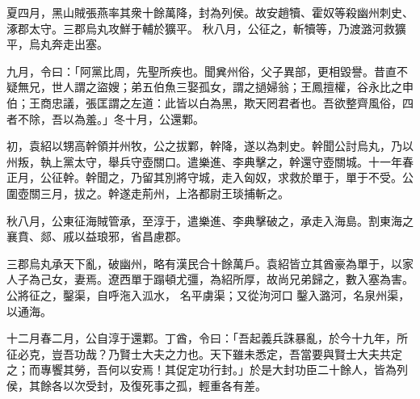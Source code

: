 \begin{pinyinscope}
夏四月，黑山賊張燕率其衆十餘萬降，封為列侯。故安趙犢、霍奴等殺幽州刺史、涿郡太守。三郡烏丸攻鮮于輔於獷平。
秋八月，公征之，斬犢等，乃渡潞河救獷平，烏丸奔走出塞。


九月，令曰：「阿黨比周，先聖所疾也。聞兾州俗，父子異部，更相毀譽。昔直不疑無兄，世人謂之盜嫂；弟五伯魚三娶孤女，謂之撾婦翁；王鳳擅權，谷永比之申伯；王商忠議，張匡謂之左道：此皆以白為黑，欺天罔君者也。吾欲整齊風俗，四者不除，吾以為羞。」冬十月，公還鄴。


初，袁紹以甥高幹領并州牧，公之拔鄴，幹降，遂以為刺史。幹聞公討烏丸，乃以州叛，執上黨太守，舉兵守壺關口。遣樂進、李典擊之，幹還守壺關城。十一年春正月，公征幹。幹聞之，乃留其別將守城，走入匈奴，求救於單于，單于不受。公圍壺關三月，拔之。幹遂走荊州，上洛都尉王琰捕斬之。


秋八月，公東征海賊管承，至淳于，遣樂進、李典擊破之，承走入海島。割東海之襄賁、郯、戚以益琅邪，省昌慮郡。


三郡烏丸承天下亂，破幽州，略有漢民合十餘萬戶。袁紹皆立其酋豪為單于，以家人子為己女，妻焉。遼西單于蹋頓尤彊，為紹所厚，故尚兄弟歸之，數入塞為害。公將征之，鑿渠，自呼沲入泒水，
名平虜渠；又從泃河口
鑿入潞河，名泉州渠，以通海。


十二月春二月，公自淳于還鄴。丁酋，令曰：「吾起義兵誅暴亂，於今十九年，所征必克，豈吾功哉？乃賢士大夫之力也。天下雖未悉定，吾當要與賢士大夫共定之；而專饗其勞，吾何以安焉！其促定功行封。」於是大封功臣二十餘人，皆為列侯，其餘各以次受封，及復死事之孤，輕重各有差。



\end{pinyinscope}
